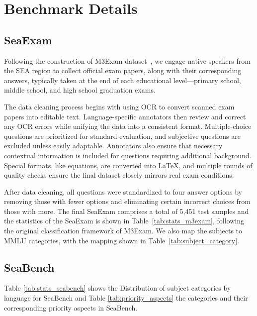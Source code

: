 \appendix
\onecolumn
\section{Benchmark Details}\label{sec:appendix_benchmark}

\subsection{SeaExam} \label{app:seaexam}
Following the construction of M3Exam dataset~\cite{zhang_m3exam_2023}, we engage native speakers from the SEA region to collect official exam papers, along with their corresponding answers, typically taken at the end of each educational level—primary school, middle school, and high school graduation exams. 

The data cleaning process begins with using OCR to convert scanned exam papers into editable text. Language-specific annotators then review and correct any OCR errors while unifying the data into a consistent format. Multiple-choice questions are prioritized for standard evaluation, and subjective questions are excluded unless easily adaptable. Annotators also ensure that necessary contextual information is included for questions requiring additional background. Special formats, like equations, are converted into LaTeX, and multiple rounds of quality checks ensure the final dataset closely mirrors real exam conditions.

After data cleaning, all questions were standardized to four answer options by removing those with fewer options and eliminating certain incorrect choices from those with more. The final SeaExam comprises a total of 5,451 test samples and the statistics of the SeaExam is shown in Table~\ref{tab:stats_m3exam}, following the original classification framework of M3Exam. We also map the subjects to MMLU categories, with the mapping shown in Table~\ref{tab:subject_category}. 






\subsection{SeaBench}
Table \ref{tab:stats_seabench} shows the Distribution of subject categories by language for SeaBench and Table \ref{tab:priority_aspects} the categories and their corresponding priority aspects in SeaBench.

